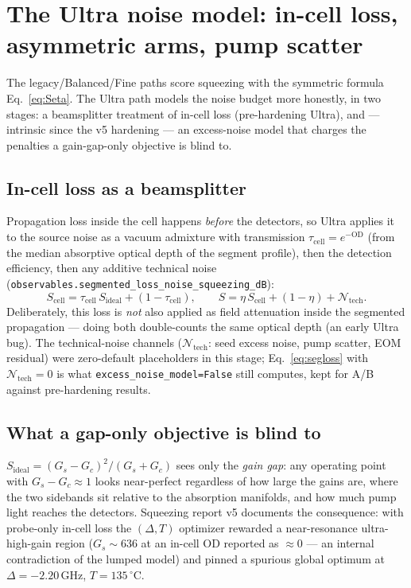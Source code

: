 \documentclass[11pt]{article}
\newcommand{\code}[1]{\texttt{#1}}
\begin{document}
\section{The Ultra noise model: in-cell loss, asymmetric arms, pump scatter}
\label{sec:hardened}

The legacy/Balanced/Fine paths score squeezing with the symmetric formula
Eq.~\eqref{eq:Seta}. The Ultra path models the noise budget more honestly, in
two stages: a beamsplitter treatment of in-cell loss (pre-hardening Ultra), and
--- intrinsic since the v5 hardening --- an excess-noise model that charges the
penalties a gain-gap-only objective is blind to.

\subsection{In-cell loss as a beamsplitter}

Propagation loss inside the cell happens \emph{before} the detectors, so Ultra
applies it to the source noise as a vacuum admixture with transmission
$\tau_{\text{cell}}=e^{-\mathrm{OD}}$ (from the median absorptive optical depth
of the segment profile), then the detection efficiency, then any additive
technical noise (\code{observables.segmented\_loss\_noise\_squeezing\_dB}):
\begin{equation}
S_{\text{cell}}=\tau_{\text{cell}}\,S_{\text{ideal}}+(1-\tau_{\text{cell}}),
\qquad
S=\eta\,S_{\text{cell}}+(1-\eta)+\mathcal{N}_{\text{tech}}.
\label{eq:segloss}
\end{equation}
Deliberately, this loss is \emph{not} also applied as field attenuation inside
the segmented propagation --- doing both double-counts the same optical depth
(an early Ultra bug). The technical-noise channels
($\mathcal{N}_{\text{tech}}$: seed excess noise, pump scatter, EOM residual)
were zero-default placeholders in this stage; Eq.~\eqref{eq:segloss} with
$\mathcal{N}_{\text{tech}}=0$ is what \code{excess\_noise\_model=False} still
computes, kept for A/B against pre-hardening results.

\subsection{What a gap-only objective is blind to}

$S_{\text{ideal}}=(G_s-G_c)^2/(G_s+G_c)$ sees only the \emph{gain gap}: any
operating point with $G_s-G_c\approx1$ looks near-perfect regardless of how
large the gains are, where the two sidebands sit relative to the absorption
manifolds, and how much pump light reaches the detectors. Squeezing report v5
documents the consequence: with probe-only in-cell loss the $(\Delta,T)$
optimizer rewarded a near-resonance ultra-high-gain region ($G_s\sim636$ at an
in-cell OD reported as $\approx0$ --- an internal contradiction of the lumped
model) and pinned a spurious global optimum at $\Delta=-2.20\,$GHz,
$T=135\,^\circ$C.
\end{document}
